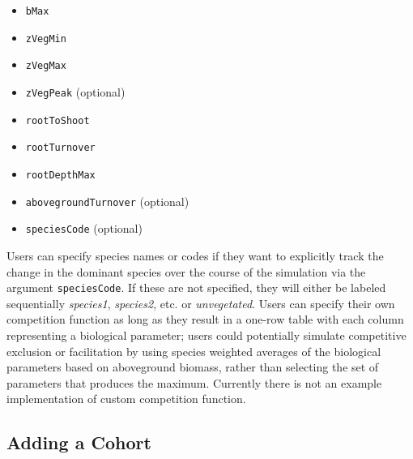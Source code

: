 \begin{itemize}
\tightlist
\item
  \texttt{bMax}
\item
  \texttt{zVegMin}
\item
  \texttt{zVegMax}
\item
  \texttt{zVegPeak} (optional)
\item
  \texttt{rootToShoot}
\item
  \texttt{rootTurnover}
\item
  \texttt{rootDepthMax}
\item
  \texttt{abovegroundTurnover} (optional)
\item
  \texttt{speciesCode} (optional)
\end{itemize}

Users can specify species names or codes if they want to explicitly
track the change in the dominant species over the course of the
simulation via the argument \texttt{speciesCode}. If these are not
specified, they will either be labeled sequentially \emph{species1},
\emph{species2}, etc. or \emph{unvegetated}. Users can specify their own
competition function as long as they result in a one-row table with each
column representing a biological parameter; users could potentially
simulate competitive exclusion or facilitation by using species weighted
averages of the biological parameters based on aboveground biomass,
rather than selecting the set of parameters that produces the maximum.
Currently there is not an example implementation of custom competition
function.

\hypertarget{adding-a-cohort}{%
\subsection{Adding a Cohort}\label{adding-a-cohort}}

